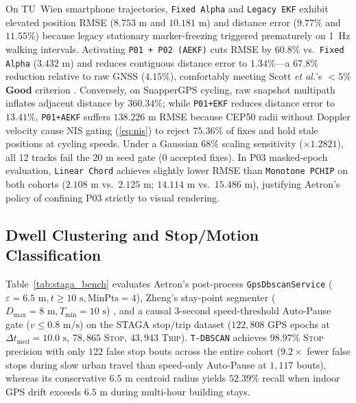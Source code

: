 \documentclass[journal]{IEEEtran}
\begin{document}
On TU~Wien smartphone trajectories, \texttt{Fixed Alpha} and \texttt{Legacy EKF} exhibit elevated position RMSE ($8.753\text{ m}$ and $10.181\text{ m}$) and distance error ($9.77\%$ and $11.55\%$) because legacy stationary marker-freezing triggered prematurely on 1~Hz walking intervals. Activating \texttt{P01 + P02 (AEKF)} cuts RMSE by $60.8\%$ vs.\ \texttt{Fixed Alpha} ($3.432\text{ m}$) and reduces contiguous distance error to $\mathbf{1.34\%}$---a $67.8\%$ reduction relative to raw GNSS ($4.15\%$), comfortably meeting Scott \emph{et al.}'s $<5\%$ \textbf{Good} criterion \cite{scott2016validity}. Conversely, on SnapperGPS cycling, raw snapshot multipath inflates adjacent distance by $360.34\%$; while \texttt{P01+EKF} reduces distance error to $13.41\%$, \texttt{P01+AEKF} suffers $138.226\text{ m}$ RMSE because CEP50 radii without Doppler velocity cause NIS gating (\ref{eq:nis}) to reject $75.36\%$ of fixes and hold stale positions at cycling speeds. Under a Gaussian $68\%$ scaling sensitivity ($\times 1.2821$), all 12 tracks fail the $20\text{ m}$ seed gate ($0$ accepted fixes). In P03 masked-epoch evaluation, \texttt{Linear Chord} achieves slightly lower RMSE than \texttt{Monotone PCHIP} on both cohorts ($2.108\text{ m}$ vs.\ $2.125\text{ m}$; $14.114\text{ m}$ vs.\ $15.486\text{ m}$), justifying Aetron's policy of confining P03 strictly to visual rendering.

\subsection{Dwell Clustering and Stop/Motion Classification}
Table~\ref{tab:staga_bench} evaluates Aetron's post-process \texttt{GpsDbscanService} ($\varepsilon=6.5\text{ m}, t\ge 10\text{ s}, \mathrm{MinPts}=4$), Zheng's stay-point segmenter ($D_{\max}=8\text{ m}, T_{\min}=10\text{ s}$) \cite{zheng2009mining}, and a causal 3-second speed-threshold Auto-Pause gate ($v \le 0.8\text{ m/s}$) on the STAGA stop/trip dataset ($122{,}808$ GPS epochs at $\Delta t_{\text{med}} = 10.0\text{ s}$, $78{,}865$ \textsc{Stop}, $43{,}943$ \textsc{Trip}). \texttt{T-DBSCAN} achieves $\mathbf{98.97\%}$ \textsc{Stop} precision with only $122$ false stop bouts across the entire cohort ($9.2\times$ fewer false stops during slow urban travel than speed-only Auto-Pause at $1{,}117$ bouts), whereas its conservative $6.5\text{ m}$ centroid radius yields $52.39\%$ recall when indoor GPS drift exceeds $6.5\text{ m}$ during multi-hour building stays.
\end{document}
